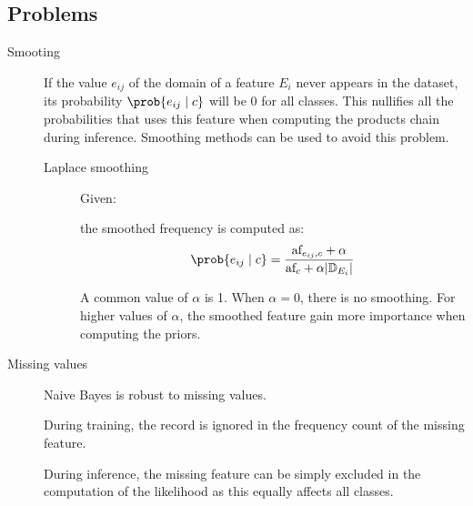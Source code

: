 \subsection{Problems}
\begin{description}
    \item[Smooting] 
        If the value $e_{ij}$ of the domain of a feature $E_i$ never appears in the dataset, 
        its probability $\prob{e_{ij} \mid c}$ will be 0 for all classes.
        This nullifies all the probabilities that uses this feature when 
        computing the products chain during inference.
        Smoothing methods can be used to avoid this problem.

        \begin{description}
            \item[Laplace smoothing] 
                Given:
                the smoothed frequency is computed as:
                \[
                    \prob{e_{ij} \mid c} = \frac{\text{af}_{e_{ij}, c} + \alpha}{\text{af}_{c} + \alpha \vert \mathbb{D}_{E_i} \vert}    
                \]

                A common value of $\alpha$ is 1.
                When $\alpha = 0$, there is no smoothing.
                For higher values of $\alpha$, the smoothed feature gain more importance when computing the priors.
        \end{description}

    \item[Missing values] 
        Naive Bayes is robust to missing values.

        During training, the record is ignored in the frequency count of the missing feature.

        During inference, the missing feature can be simply excluded in the computation of the likelihood
        as this equally affects all classes.


\end{description}
